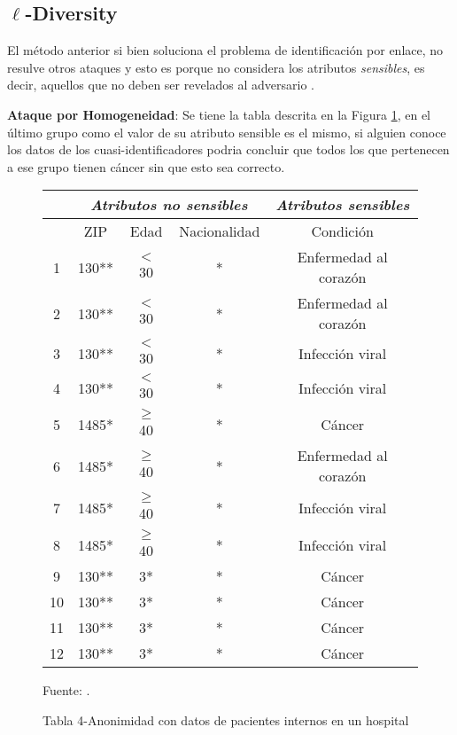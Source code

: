\subsection{$\ell$-Diversity}
El método anterior si bien soluciona el problema de identificación por enlace, no resulve otros ataques y esto es porque no considera los atributos \textit{sensibles}, es decir, aquellos que no deben ser revelados al adversario \cite{machanavajjhala2006ell}.

\textbf{Ataque por Homogeneidad}: Se tiene la tabla descrita en la Figura \ref{fig:ataques}, en el último grupo como el valor de su atributo sensible es el mismo, si alguien conoce los datos de los cuasi-identificadores podria concluir que todos los que pertenecen a ese grupo tienen cáncer sin que esto sea correcto.

\begin{figure}[H]
    \centering
    \begin{tabular}{|c||c|c|c|c|}
        \hline
        & \multicolumn{3}{|c|}{\textit{Atributos no sensibles}} & \textit{Atributos sensibles} \\
        \hline
        & ZIP & Edad & Nacionalidad & Condición \\
        \hline
        1 & 130** & $<$ 30 & * & Enfermedad al corazón \\
        2 & 130** & $<$ 30 & * & Enfermedad al corazón \\
        3 & 130** & $<$ 30 & * & Infección viral \\
        4 & 130** & $<$ 30 & * & Infección viral \\
        \hline
        5 & 1485* & $\geq$ 40 & * & Cáncer \\
        6 & 1485* & $\geq$ 40 & * & Enfermedad al corazón \\
        7 & 1485* & $\geq$ 40 & * & Infección viral \\
        8 & 1485* & $\geq$ 40 & * & Infección viral \\
        \hline
        9 & 130** & 3* & * & Cáncer \\
        10 & 130** & 3* & * & Cáncer \\
        11 & 130** & 3* & * & Cáncer \\
        12 & 130** & 3* & * & Cáncer \\
        \hline
    \end{tabular}
    \caption{\label{fig:ataques}Tabla 4-Anonimidad con datos de pacientes internos en un hospital} Fuente: \cite{machanavajjhala2006ell}.
\end{figure}

